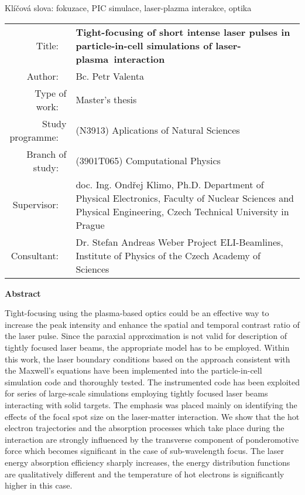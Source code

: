\documentclass[12pt, twoside, a4paper, openright]{report}
\newcommand{\projecttitle}{Tight-focusing of short intense laser pulses in particle-in-cell simulations of laser-plasma~interaction }
\newcommand{\valenta}{Bc. Petr Valenta }
\newcommand{\klimo}{doc. Ing. Ondřej Klimo, Ph.D. }
\newcommand{\weber}{Dr. Stefan Andreas Weber }
\newcommand{\keywordscz}{fokuzace, PIC simulace, laser-plazma interakce, optika}
\begin{document}
\noindent Klíčová slova: \keywordscz



\newpage
\begin{flushleft}
	\renewcommand{\arraystretch}{1.3}
	\begin{tabular}{r p{12cm}}
		Title:
		~ & \bf \projecttitle \\
		Author:
		~ & \valenta \\
		Type of work:
		~ & Master's thesis \\
		Study programme:
		~ & (N3913) Aplications of Natural Sciences	 \\
		Branch of study:
		~ & (3901T065) Computational Physics \\
		Supervisor:
		~ & \klimo \newline Department of Physical Electronics, Faculty of Nuclear Sciences and Physical Engineering, Czech Technical University in Prague \\
		Consultant:
		~ & \weber \newline Project ELI-Beamlines, Institute of Physics of the Czech Academy of Sciences \\
	\end{tabular}
\end{flushleft}

\begin{center}
	\textbf{Abstract}\\
\end{center}

Tight-focusing using the plasma-based optics could be an effective way to increase the peak intensity and enhance the spatial and temporal contrast ratio of the laser pulse. Since the paraxial approximation is not valid for description of tightly focused laser beams, the appropriate model has to be employed. Within this work, the laser boundary conditions based on the approach consistent with the Maxwell's equations have been implemented into the particle-in-cell simulation code and thoroughly tested. The instrumented code has been exploited for series of large-scale simulations employing tightly focused laser beams interacting with solid targets. The emphasis was placed mainly on identifying the effects of the focal spot size on the laser-matter interaction. We show that the hot electron trajectories and the absorption processes which take place during the interaction are strongly influenced by the transverse component of ponderomotive force which becomes significant in the case of sub-wavelength focus. The laser energy absorption efficiency sharply increases, the energy distribution functions are qualitatively different and the temperature of hot electrons is significantly higher in this case. \\
\end{document}
